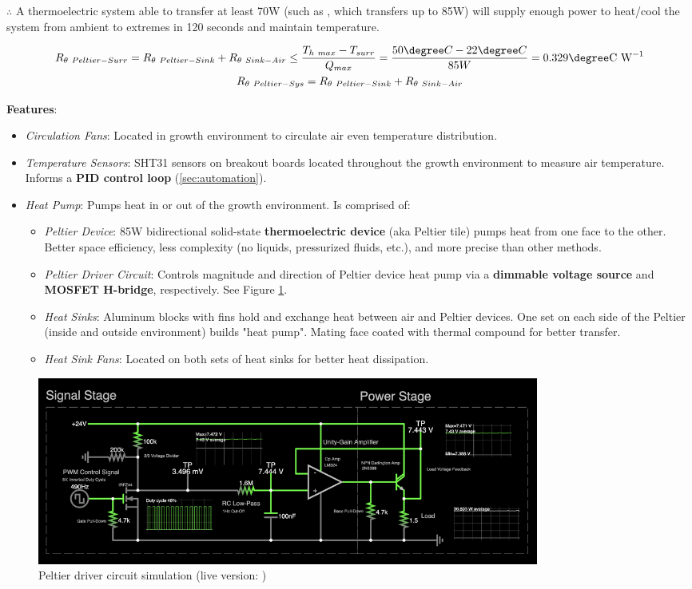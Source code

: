 $\therefore$ A thermoelectric system able to transfer at least 70W (such as \cite{peltier}, which transfers up to 85W) will supply enough power to heat/cool the system from ambient to extremes in 120 seconds and maintain temperature.

\begin{gather*}
  \label{eqn:thermalresistance-hot}
  R_{\theta~Peltier-Surr}=R_{\theta~Peltier-Sink}+R_{\theta~Sink-Air}\le\frac{T_{h~max} - T_{surr}}{Q_{max}}=\frac{50\degree C - 22\degree C}{85W}=0.329\degree \text{C W}^{-1}\\
  \label{eqn:thermalresistance-cold}
  R_{\theta~Peltier-Sys}=R_{\theta~Peltier-Sink}+R_{\theta~Sink-Air}
\end{gather*}

\textbf{Features}:
\begin{itemize}
    \item \textit{Circulation Fans}: Located in growth environment to circulate air even temperature distribution.
    \item \textit{Temperature Sensors}: SHT31 \cite{sht31} sensors on breakout boards located throughout the growth environment to measure air temperature. Informs a \textbf{PID control loop} (\ref{sec:automation}).
    \item \textit{Heat Pump}: Pumps heat in or out of the growth environment. Is comprised of:
    \begin{itemize}
        \item \textit{Peltier Device}: 85W bidirectional solid-state \textbf{thermoelectric device} (aka Peltier tile) \cite{peltier} pumps heat from one face to the other. Better space efficiency, less complexity (no liquids, pressurized fluids, etc.), and more precise than other methods.
        \item \textit{Peltier Driver Circuit}: Controls magnitude and direction of Peltier device heat pump via a \textbf{dimmable voltage source} and \textbf{MOSFET H-bridge}, respectively. See Figure \ref{fig:peltierdriver}.
        \item \textit{Heat Sinks}: Aluminum blocks with fins hold and exchange heat between air and Peltier devices. One set on each side of the Peltier (inside and outside environment) builds "heat pump". Mating face coated with thermal compound for better transfer.
        \item \textit{Heat Sink Fans}: Located on both sets of heat sinks for better heat dissipation.
    \end{itemize}
\end{itemize}

\begin{figure}[h]
  \centering
  \includegraphics[width=0.8\textwidth]{images/thermosim.png}
  \hfill
  \caption{Peltier driver circuit simulation (live version: \cite{thermo-falstad})}
  \label{fig:peltierdriver}
\end{figure}
